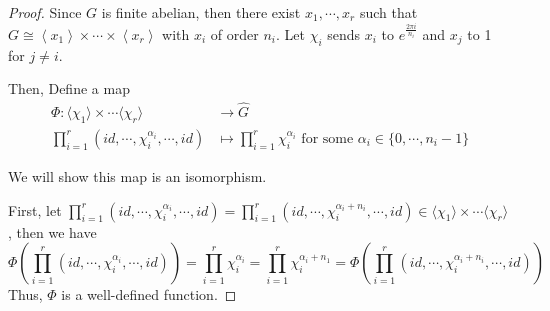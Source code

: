 \begin{answer}
    \begin{proof}
        Since $G$ is finite abelian, then there exist $x_1,\cdots,x_r$ such that $G \cong \left\langle x_1\right\rangle \times \cdots \times\left\langle x_r\right\rangle$ with $x_i$ of order $n_i$. Let $\chi_i$ sends $x_i$ to $e^{\frac{2 \pi i}{n_i}}$ and $x_j$ to 1 for $j \neq i$.
        
        Then, Define a map
        \begin{equation}
            \begin{aligned}
                \Phi: \langle \chi_1 \rangle \times \cdots \langle \chi_r \rangle &\to \hat{G}\\
                \prod_{i = 1}^r(id,\cdots, \chi_i^{\alpha_i}, \cdots, id) &\mapsto \prod_{i = 1}^r \chi_i^{\alpha_i} \text{ for some $\alpha_i \in \{0,\cdots,n_i-1\}$}
            \end{aligned}
        \end{equation}
    
        We will show this map is an isomorphism.

        First, let $\prod_{i = 1}^r(id,\cdots, \chi_i^{\alpha_i}, \cdots, id) = \prod_{i = 1}^r(id,\cdots, \chi_i^{\alpha_i+n_i}, \cdots, id) \in \langle \chi_1 \rangle \times \cdots \langle \chi_r \rangle$, then we have 
        \begin{equation}
            \Phi\left(\prod_{i = 1}^r(id,\cdots, \chi_i^{\alpha_i}, \cdots, id)\right) = \prod_{i = 1}^r \chi_i^{\alpha_i} = \prod_{i = 1}^r \chi_i^{\alpha_i+n_1} = \Phi\left(\prod_{i = 1}^r(id,\cdots, \chi_i^{\alpha_i+n_i}, \cdots, id)\right)
        \end{equation}
        Thus, $\Phi$ is a well-defined function.
        

\end{proof}
\end{answer}
